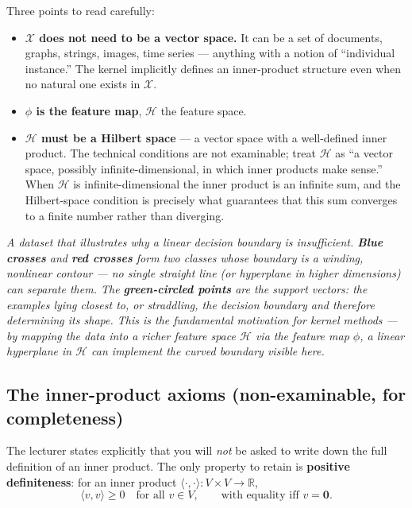 \documentclass[11pt, a4paper]{article}
\begin{document}
Three points to read carefully:
\begin{itemize}
  \item \textbf{$\mathcal{X}$ does not need to be a vector space.} It can be a set of documents, graphs, strings, images, time series — anything with a notion of ``individual instance.'' The kernel implicitly defines an inner-product structure even when no natural one exists in $\mathcal{X}$.
  \item \textbf{$\phi$ is the feature map}, $\mathcal{H}$ the feature space.
  \item \textbf{$\mathcal{H}$ must be a Hilbert space} — a vector space with a well-defined inner product. The technical conditions are not examinable; treat $\mathcal{H}$ as ``a vector space, possibly infinite-dimensional, in which inner products make sense.'' When $\mathcal{H}$ is infinite-dimensional the inner product is an infinite sum, and the Hilbert-space condition is precisely what guarantees that this sum converges to a finite number rather than diverging.
\end{itemize}

\begin{center}

\footnotesize\textit{A dataset that illustrates why a linear decision boundary is insufficient. \textbf{Blue crosses} and \textbf{red crosses} form two classes whose boundary is a winding, nonlinear contour --- no single straight line (or hyperplane in higher dimensions) can separate them. The \textbf{green-circled points} are the support vectors: the examples lying closest to, or straddling, the decision boundary and therefore determining its shape. This is the fundamental motivation for kernel methods --- by mapping the data into a richer feature space $\mathcal{H}$ via the feature map $\phi$, a linear hyperplane in $\mathcal{H}$ can implement the curved boundary visible here.}
\end{center}

\subsection{The inner-product axioms (non-examinable, for completeness)}

\begin{defbox}
The lecturer states explicitly that you will \emph{not} be asked to write down the full definition of an inner product. The only property to retain is \textbf{positive definiteness}: for an inner product $\langle\cdot, \cdot\rangle : V\times V \to \mathbb{R}$,
\[
\langle v, v\rangle \ge 0 \quad\text{for all } v\in V, \qquad \text{with equality iff } v = \mathbf{0}.
\]
\end{defbox}
\end{document}
